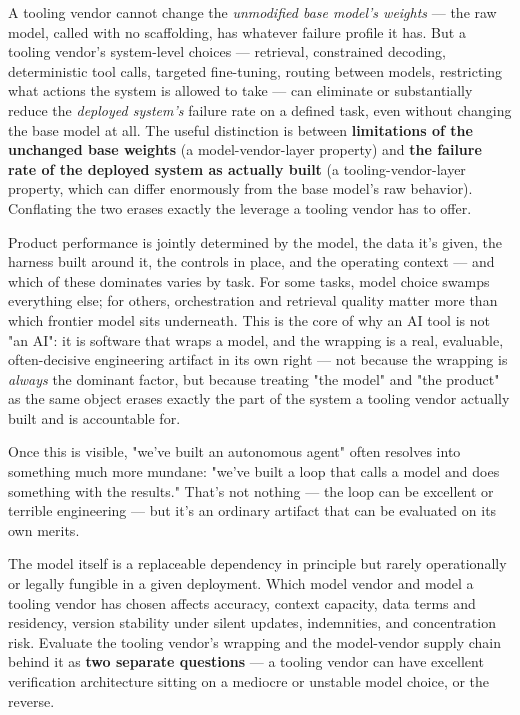 A tooling vendor cannot change the \emph{unmodified base model's weights} --- the raw model, called with no scaffolding, has whatever failure profile it has. But a tooling vendor's system-level choices --- retrieval, constrained decoding, deterministic tool calls, targeted fine-tuning, routing between models, restricting what actions the system is allowed to take --- can eliminate or substantially reduce the \emph{deployed system's} failure rate on a defined task, even without changing the base model at all. The useful distinction is between \textbf{limitations of the unchanged base weights} (a model-vendor-layer property) and \textbf{the failure rate of the deployed system as actually built} (a tooling-vendor-layer property, which can differ enormously from the base model's raw behavior). Conflating the two erases exactly the leverage a tooling vendor has to offer.

Product performance is jointly determined by the model, the data it's given, the harness built around it, the controls in place, and the operating context --- and which of these dominates varies by task. For some tasks, model choice swamps everything else; for others, orchestration and retrieval quality matter more than which frontier model sits underneath. This is the core of why an AI tool is not "an AI": it is software that wraps a model, and the wrapping is a real, evaluable, often-decisive engineering artifact in its own right --- not because the wrapping is \emph{always} the dominant factor, but because treating "the model" and "the product" as the same object erases exactly the part of the system a tooling vendor actually built and is accountable for.

Once this is visible, "we've built an autonomous agent" often resolves into something much more mundane: "we've built a loop that calls a model and does something with the results." That's not nothing --- the loop can be excellent or terrible engineering --- but it's an ordinary artifact that can be evaluated on its own merits.

The model itself is a replaceable dependency in principle but rarely operationally or legally fungible in a given deployment. Which model vendor and model a tooling vendor has chosen affects accuracy, context capacity, data terms and residency, version stability under silent updates, indemnities, and concentration risk. Evaluate the tooling vendor's wrapping and the model-vendor supply chain behind it as \textbf{two separate questions} --- a tooling vendor can have excellent verification architecture sitting on a mediocre or unstable model choice, or the reverse.

